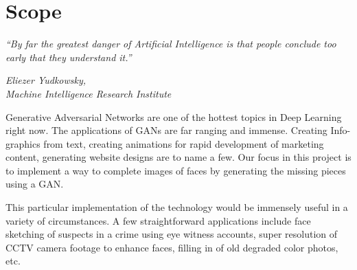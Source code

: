 {\chapter{Scope}\label{ch:scope}}
\epigraph{\textit{\normalsize “By far the greatest danger of Artificial Intelligence is that people conclude too early that they understand it.”}}{\textit{ \normalsize Eliezer Yudkowsky,\\ Machine Intelligence Research Institute}}
Generative Adversarial Networks are one of the hottest topics in Deep Learning right now. The applications of GANs are far ranging and immense. Creating Info-graphics from text, creating animations for rapid development of marketing content, generating website designs are to name a few. Our focus in this project is to implement a way to complete images of faces by generating the missing pieces using a GAN. 

\par\bigskip
This particular implementation of the technology would be immensely useful in a variety of circumstances. A few straightforward applications include face sketching of suspects in a crime using eye witness accounts, super resolution of CCTV camera footage to enhance faces, filling in of old degraded color photos, etc.